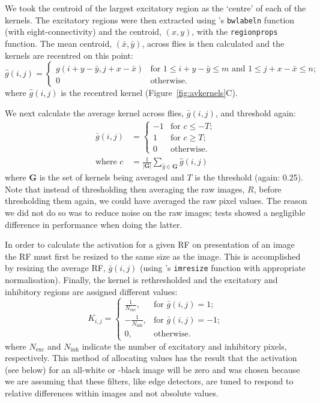 We took the centroid of the largest excitatory region as the `centre' of each of the kernels.
The excitatory regions were then extracted using \Matlab's \texttt{bwlabeln} function (with eight-connectivity) and the centroid, $(x,y)$, with the \texttt{regionprops} function.
The mean centroid, $(\bar{x},\bar{y})$, across flies is then calculated and the kernels are recentred on this point:
$$
\hat{g}(i,j) = \left\{ \begin{array}{ll} g(i+y-\bar{y},j+x-\bar{x}) & \mbox{for } 1\le i+y-\bar{y}\le m \mbox{ and } 1\le j+x-\bar{x}\le n;\\
0 & \mbox{otherwise.} \end{array} \right.
$$
where $\hat{g}(i,j)$ is the recentred kernel (Figure~\ref{fig:avkernels}C).

We next calculate the average kernel across flies, $\bar{g}(i,j)$, and threshold again:
\begin{align*}
\bar{g}(i,j) &= \left\{ \begin{array}{rl}
-1 & \mbox{for } c \le -T; \\
1 & \mbox{for } c \ge T; \\
0 & \mbox{otherwise.} 
\end{array} \right. \\
\mbox{where } c &= \frac{1}{|\mathbf{G}|}\sum\limits_{\hat{g} \in \mathbf{G}} \hat{g}(i,j)
\end{align*}
where $\mathbf{G}$ is the set of kernels being averaged and $T$ is the threshold (again: 0.25). Note that instead of thresholding then averaging the raw images, $R$, before thresholding them again, we could have averaged the raw pixel values. The reason we did not do so was to reduce noise on the raw images; tests showed a negligible difference in performance when doing the latter.

In order to calculate the activation for a given RF on presentation of an image the RF must first be resized to the same size as the image.
This is accomplished by resizing the average RF, $\bar{g}(i,j)$ (using \Matlab's \texttt{imresize} function with appropriate normalisation).
Finally, the kernel is rethresholded and the excitatory and inhibitory regions are assigned different values:
$$
K_{i,j} = \left\{
\begin{array}{rl}
\frac{1}{N_\mathrm{exc}}, & \mbox{for } \bar{g}(i,j) = 1; \\
-\frac{1}{N_\mathrm{inh}}, & \mbox{for } \bar{g}(i,j) = -1; \\
0, & \mbox{otherwise.}
\end{array}
\right.
$$
where $N_\mathrm{exc}$ and $N_\mathrm{inh}$ indicate the number of excitatory and inhibitory pixels, respectively.
This method of allocating values has the result that the activation (see below) for an all-white or -black image will be zero and was chosen because we are assuming that these filters, like edge detectors, are tuned to respond to relative differences within images and not absolute values.

